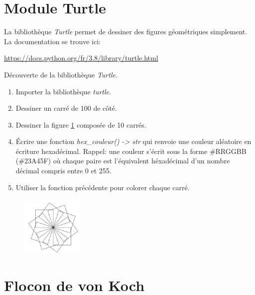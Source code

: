 \documentclass[a4paper,11pt]{article}
\begin{document}
\begin{Form}
\section{Module Turtle}
La bibliothèque \emph{Turtle} permet de dessiner des figures géométriques simplement. La documentation se trouve ici:
\begin{center}
\url{https://docs.python.org/fr/3.8/library/turtle.html}
\end{center}
\begin{activite}
Découverte de la bibliothèque \emph{Turtle}.
\begin{enumerate}
\item Importer la bibliothèque \emph{turtle}.
\item Dessiner un carré de 100 de côté.
\item Dessiner la figure \ref{etoile} composée de 10 carrés.
\item Écrire une fonction \emph{hex\_couleur() -> str} qui renvoie une couleur aléatoire en écriture hexadécimal. Rappel: une couleur s'écrit sous la forme \#RRGGBB (\#23A45F) où chaque paire est l'équivalent héxadécimal d'un nombre décimal compris entre 0 et 255.
\item Utiliser la fonction précédente pour colorer chaque carré.
\end{enumerate}
\end{activite}
\begin{figure}[!h]
\centering
\includegraphics[width=3cm]{ressources/etoile.png}
\label{etoile}
\end{figure}
\section{Flocon de von Koch}

\end{Form}
\end{document}
